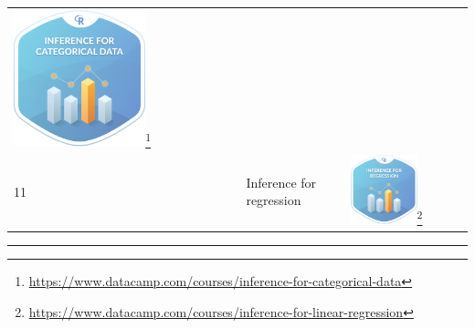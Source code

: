 \documentclass[12pt,]{krantz}
\renewcommand{\href}[2]{#2\footnote{\url{#1}}}
\theoremstyle{definition}
\theoremstyle{definition}
\theoremstyle{definition}
\theoremstyle{remark}
\begin{document}
\begin{longtable}[]{@{}lll@{}}
\begin{minipage}[t]{0.30\columnwidth}
\href{https://www.datacamp.com/courses/inference-for-categorical-data}{\includegraphics[width=0.6\textwidth]{images/datacamp_inference_for_categorical_data.png}}\strut
\end{minipage}\tabularnewline
\begin{minipage}[t]{0.30\columnwidth}\raggedright\strut
11\strut
\end{minipage} & \begin{minipage}[t]{0.30\columnwidth}\raggedright\strut
Inference for regression\strut
\end{minipage} & \begin{minipage}[t]{0.30\columnwidth}\raggedright\strut
\href{https://www.datacamp.com/courses/inference-for-linear-regression}{\includegraphics[width=0.6\textwidth]{images/datacamp_inference_for_regression.png}}\strut
\end{minipage}\tabularnewline
\bottomrule
\end{longtable}

\begin{center}\rule{0.5\linewidth}{\linethickness}\end{center}
\end{document}
